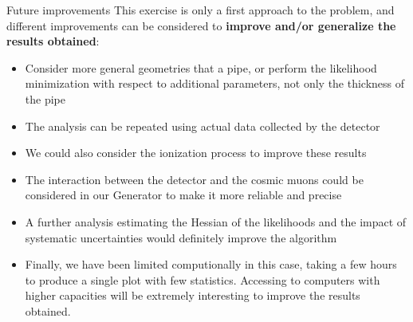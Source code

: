 \documentclass[handout,8 pt]{beamer}
\newcommand{\backupend}{
   \setcounter{framenumber}{\value{finalframe}}
}
\begin{document}
\begin{frame}{Future improvements}
\justifying
This exercise is only a first approach to the problem, and different improvements can be considered to \textbf{improve and/or generalize the results obtained}:
\begin{itemize}
\justifying
\item Consider more general geometries that a pipe, or perform the likelihood minimization with respect to additional parameters, not only the thickness of the pipe
\item The analysis can be repeated using actual data collected by the detector
\item We could also consider the ionization process to improve these results
\item The interaction between the detector and the cosmic muons could be considered in our Generator to make it more reliable and precise
\item A further analysis estimating the Hessian of the likelihoods and the impact of systematic uncertainties would definitely improve the algorithm
\item Finally, we have been limited computionally in this case, taking a few hours to produce a single plot with few statistics. Accessing to computers with higher capacities will be extremely interesting to improve the results obtained.
\end{itemize}
\end{frame}

\backupend


 
\end{document}
